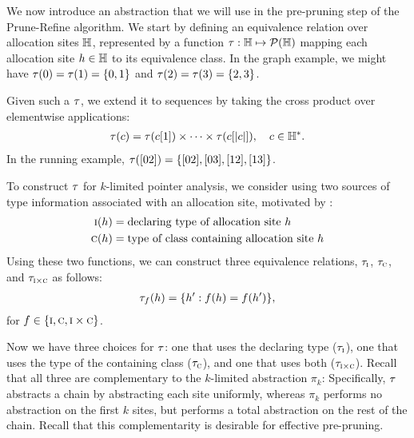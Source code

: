 We now introduce an abstraction that we will use in the pre-pruning step of the Prune-Refine algorithm.
We start by defining an equivalence relation over allocation sites ${\mathbb H}$,
represented by a function $\tau : {\mathbb H} \mapsto \mathcal{P}({\mathbb H})$
mapping each allocation site $h \in {\mathbb H}$ to its equivalence class.
In the graph example, we might have
$\tau(0) = \tau(1) = \{ 0,1 \}$
and $\tau(2) = \tau(3) = \{ 2,3 \}$.

Given such a $\tau$, we extend it to sequences by taking the cross product over elementwise applications:
\begin{align}
\tau(c) = \tau(c[1]) \times \cdots \times \tau(c[|c|]), \quad c \in {\mathbb H}^*.
\end{align}
In the running example, $\tau([02]) = \{ [02], [03], [12], [13] \}$.

To construct $\tau$ for $k$-limited pointer analysis, we consider using two sources of type information associated
with an allocation site, motivated by \cite{smaragdakis11context}:
\begin{align}
\text{\sc i}(h)  &= \text{declaring type of allocation site $h$} \label{eqn:typeIs} \\
\text{\sc c}(h) &= \text{type of class containing allocation site $h$} \label{eqn:typeHas}
\end{align}
Using these two functions, we can construct three equivalence relations,
$\tau_{\text{\sc i}}$, $\tau_{\text{\sc c}}$, and $\tau_{\text{\sc i} \times \text{\sc c}}$ as follows:
\begin{align}
\tau_f(h) = \{ h' : f(h) = f(h') \}, \label{eqn:hclass}
\end{align}
for $f \in \{ \text{\sc i}, \text{\sc c}, \text{\sc i} \times \text{\sc c} \}$.

Now we have three choices for $\tau$: one that uses the declaring type ($\tau_{\text{\sc i}}$),
one that uses the type of the containing class ($\tau_{\text{\sc c}}$), and one that uses both ($\tau_{\text{\sc i} \times \text{\sc c}}$).
Recall that all three are complementary to the
$k$-limited abstraction $\pi_k$: Specifically, $\tau$ abstracts a chain by abstracting each site
uniformly, whereas $\pi_k$ performs no abstraction on the first $k$ sites, but performs a total abstraction
on the rest of the chain.  Recall that this complementarity is desirable for effective pre-pruning.


